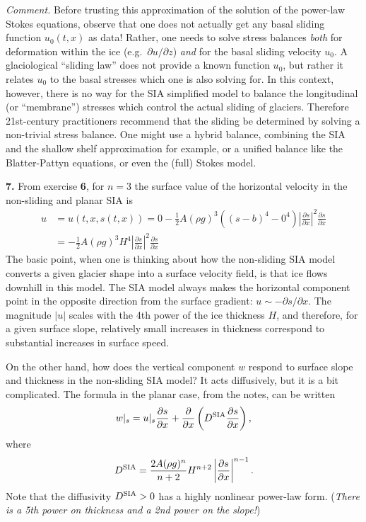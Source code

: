 \documentclass[12pt]{amsart}
\newcommand{\prob}[1]{\bigskip\noindent\textbf{#1.}\quad }
\begin{document}
\medskip
\noindent \emph{Comment.}  Before trusting this approximation of the solution of the power-law Stokes equations, observe that one does not actually get any basal sliding function $u_0(t,x)$ as data!  Rather, one needs to solve stress balances \emph{both} for deformation within the ice (e.g.~$\partial u/\partial z$) \emph{and} for the basal sliding velocity $u_0$.  A glaciological ``sliding law'' does not provide a known function $u_0$, but rather it relates $u_0$ to the basal stresses which one is also solving for.  In this context, however, there is no way for the SIA simplified model to balance the longitudinal (or ``membrane'') stresses which control the actual sliding of glaciers.  Therefore 21st-century practitioners recommend that the sliding be determined by solving a non-trivial stress balance.  One might use a hybrid balance, combining the SIA and the shallow shelf approximation for example, or a unified balance like the Blatter-Pattyn equations, or even the (full) Stokes model.


\prob{7}  From exercise \textbf{6}, for $n=3$ the surface value of the horizontal velocity in the non-sliding and planar SIA is
\begin{align*}
u &= u(t,x,s(t,x)) = 0 - \frac{1}{2} A (\rho g)^3 \left((s-b)^4 - 0^4\right) \left|\frac{\partial s}{\partial x}\right|^2 \frac{\partial s}{\partial x} \\
  &= - \frac{1}{2} A (\rho g)^3 H^4 \left|\frac{\partial s}{\partial x}\right|^2 \frac{\partial s}{\partial x}
\end{align*}
The basic point, when one is thinking about how the non-sliding SIA model converts a given glacier shape into a surface velocity field, is that ice flows downhill in this model.  The SIA model always makes the horizontal component point in the opposite direction from the surface gradient: $u \sim - \partial s/\partial x$.  The magnitude $|u|$ scales with the 4th power of the ice thickness $H$, and therefore, for a given surface slope, relatively small increases in thickness correspond to substantial increases in surface speed.

\newcommand{\Dsia}{D^{\text{\textrm{SIA}}}}

On the other hand, how does the vertical component $w$ respond to surface slope and thickness in the non-sliding SIA model?  It acts diffusively, but it is a bit complicated.  The formula in the planar case, from the notes, can be written
	$$w|_s = u|_s \frac{\partial s}{\partial x} + \frac{\partial}{\partial x}\left(\Dsia \frac{\partial s}{\partial x}\right),$$
where
    $$\Dsia = \frac{2 A (\rho g)^n}{n+2} H^{n+2} \left|\frac{\partial s}{\partial x}\right|^{n-1}.$$
Note that the diffusivity $\Dsia>0$ has a highly nonlinear power-law form.  (\emph{There is a 5th power on thickness and a 2nd power on the slope!})
\end{document}
